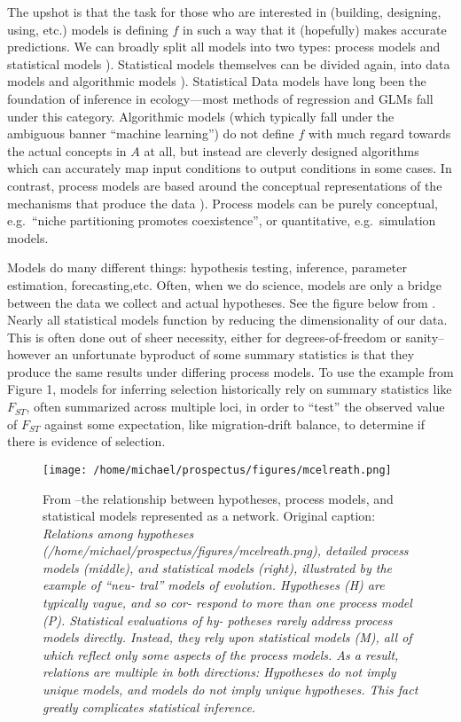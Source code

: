 \documentclass[]{article}
\begin{document}
The upshot is that the task for those who are interested in (building,
designing, using, etc.) models is defining \(f\) in such a way that it
(hopefully) makes accurate predictions. We can broadly split all models
into two types: process models and statistical models
\citep{mcelreath_statistical_2020}). Statistical models themselves can be divided
again, into data models and algorithmic models \citep{breiman_statistical_2001}).
Statistical Data models have long been the foundation of inference in
ecology---most methods of regression and GLMs fall under this category.
Algorithmic models (which typically fall under the ambiguous banner
``machine learning'') do not define \(f\) with much regard towards the
actual concepts in \(A\) at all, but instead are cleverly designed
algorithms which can accurately map input conditions to output
conditions in some cases. In contrast, process models are based around
the conceptual representations of the mechanisms that produce the data \citep{mcelreath_statistical_2020}). Process models can be purely conceptual, e.g.~``niche partitioning promotes
coexistence'', or quantitative, e.g.~simulation models.

Models do many different things: hypothesis testing, inference,
parameter estimation, forecasting,etc. Often, when we do science, models
are only a bridge between the data we collect and actual hypotheses. See
the figure below from \citep{mcelreath_statistical_2020}. Nearly all statistical
models function by reducing the dimensionality of our data. This is
often done out of sheer necessity, either for degrees-of-freedom or
sanity--however an unfortunate byproduct of some summary statistics is
that they produce the same results under differing process models. To
use the example from Figure 1, models for inferring selection
historically rely on summary statistics like \(F_{ST}\), often
summarized across multiple loci, in order to ``test'' the observed value
of \(F_{ST}\) against some expectation, like migration-drift balance, to
determine if there is evidence of selection.

\begin{figure}[h]
\centering
\texttt{[image: /home/michael/prospectus/figures/mcelreath.png]}
    \caption{From \citet{mcelreath_statistical_2020}--the relationship between hypotheses,
process models, and statistical models represented as a network.
Original caption: \emph{Relations among hypotheses
(/home/michael/prospectus/figures/mcelreath.png), detailed process
models (middle), and statistical models (right), illustrated by the
example of ``neu- tral'' models of evolution. Hypotheses (H) are
typically vague, and so cor- respond to more than one process model (P).
Statistical evaluations of hy- potheses rarely address process models
directly. Instead, they rely upon statistical models (M), all of which
reflect only some aspects of the process models. As a result, relations
are multiple in both directions: Hypotheses do not imply unique models,
and models do not imply unique hypotheses. This fact greatly complicates
statistical inference.}}
\end{figure}
\end{document}

